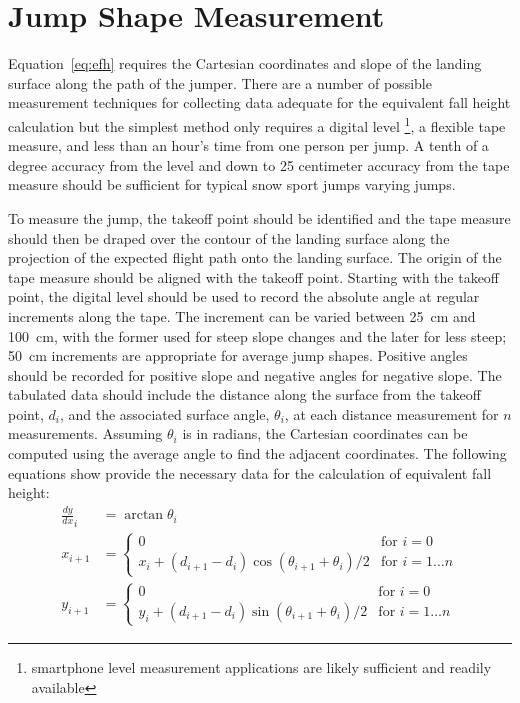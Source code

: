 \documentclass{article}
\begin{document}
\section{Jump Shape Measurement}
%
Equation~\ref{eq:efh} requires the Cartesian coordinates and slope of the
landing surface along the path of the jumper. There are a number of possible
measurement techniques for collecting data adequate for the equivalent fall
height calculation but the simplest method only requires a digital level
\footnote{smartphone level measurement applications are likely sufficient and
readily available}, a flexible tape measure, and less than an hour's time from
one person per jump. A tenth of a degree accuracy from the level and down to 25
centimeter accuracy from the tape measure should be sufficient for typical snow
sport jumps varying jumps.

To measure the jump, the takeoff point should be identified and the tape
measure should then be draped over the contour of the landing surface along the
projection of the expected flight path onto the landing surface. The origin of
the tape measure should be aligned with the takeoff point. Starting with the
takeoff point, the digital level should be used to record the absolute angle at
regular increments along the tape. The increment can be varied between
25~\si{\centi\meter} and 100~\si{\centi\meter}, with the former used for steep
slope changes and the later for less steep; 50~\si{\centi\meter} increments are
appropriate for average jump shapes. Positive angles should be recorded for
positive slope and negative angles for negative slope. The tabulated data
should include the distance along the surface from the takeoff point, $d_i$,
and the associated surface angle, $\theta_i$, at each distance measurement for
$n$ measurements. Assuming $\theta_i$ is in radians, the Cartesian coordinates
can be computed using the average angle to find the adjacent coordinates. The
following equations show provide the necessary data for the calculation of
equivalent fall height:
%
\begin{align}
  \frac{dy}{dx}_{i} & = \arctan{\theta_i} \\
  x_{i + 1} & =
  \begin{cases}
    0 & \text{for } i=0 \\
    x_i + (d_{i+1} - d_i)\cos{(\theta_{i+1} + \theta_i)/2} &  \text{for } i=1\ldots n
  \end{cases} \\
  y_{i + 1} & =
  \begin{cases}
    0 & \text{for } i=0 \\
    y_i + (d_{i+1} - d_i)\sin{(\theta_{i+1} + \theta_i)/2} &  \text{for } i=1\ldots n
  \end{cases}
\end{align}
\end{document}
